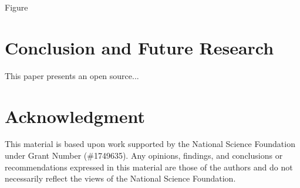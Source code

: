 \documentclass[conference]{IEEEtran}
\begin{document}
Figure 

\section{Conclusion and Future Research}\label{sec:Concl}
This paper presents an open source...

\section*{Acknowledgment}
This material is based upon work supported by the National Science Foundation under Grant Number (\#1749635). Any opinions, findings, and conclusions or recommendations expressed in this material are those of the authors and do not necessarily reflect the views of the National Science Foundation.



\end{document}

